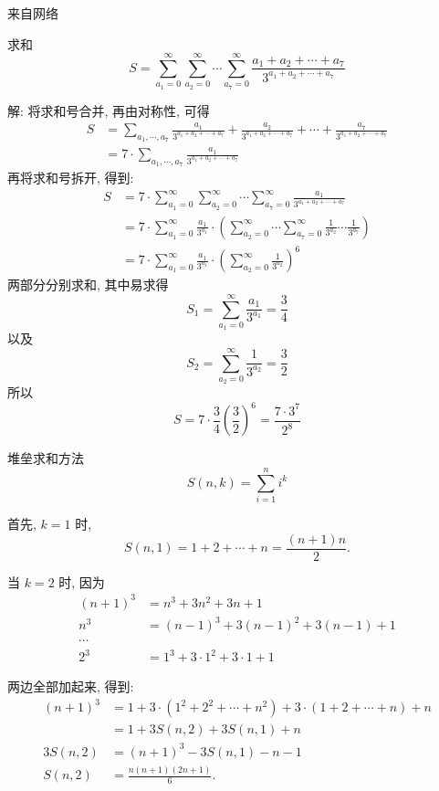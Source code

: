 \noindent 来自网络

求和
\[ 
S = \sum_{a_1=0}^{\infty}\sum_{a_2=0}^{\infty}\cdots\sum_{a_7=0}^{\infty}{\frac{a_1+a_2+\cdots+a_7}{3^{a_1+a_2+\cdots+a_7}}}
\]

解: 将求和号合并, 再由对称性, 可得
\begin{align*}
S &= \sum_{a_1,\cdots,a_7} {\frac{a_1}{3^{a_1+a_2+\cdots+a_7}} + \frac{a_2}{3^{a_1+a_2+\cdots+a_7}} + \cdots + \frac{a_7}{3^{a_1+a_2+\cdots+a_7}}} \\
 &= 7\cdot\sum_{a_1,\cdots,a_7} {\frac{a_1}{3^{a_1+a_2+\cdots+a_7}}}
\end{align*}
再将求和号拆开, 得到:
\begin{align*}
S &= 7\cdot \sum_{a_1=0}^{\infty}\sum_{a_2=0}^{\infty}\cdots\sum_{a_7=0}^{\infty}{\frac{a_1}{3^{a_1+a_2+\cdots+a_7}}} \\
&=  7\cdot \sum_{a_1=0}^{\infty}\frac{a_1}{3^{a_1}}\cdot\left(\sum_{a_2=0}^{\infty}\cdots\sum_{a_7=0}^{\infty}{\frac{1}{3^{a_2}}\cdots\frac{1}{3^{a_7}}}\right)\\
&= 7\cdot \sum_{a_1=0}^{\infty}\frac{a_1}{3^{a_1}}\cdot\left(\sum_{a_2=0}^{\infty}{\frac{1}{3^{a_2}}}\right)^6
\end{align*}
两部分分别求和, 其中易求得
\[
S_1 = \sum_{a_1=0}^{\infty}\frac{a_1}{3^{a_1}} = \frac{3}{4}
\]
以及 
\[ S_2 = \sum_{a_2=0}^{\infty}\frac{1}{3^{a_2}} = \frac{3}{2}
\]
所以 
\[
S = 7\cdot\frac{3}{4}(\frac{3}{2})^6 = \frac{7\cdot 3^7}{2^8}
\]


\newpage

\noindent 堆垒求和方法
\[ S(n,k) = \sum_{i=1}^{n}{i^k} \]

首先, $ k = 1 $ 时, \[ S(n,1) = 1 + 2 + \cdots + n = \frac{(n+1)n}{2} .\]

当 $ k = 2 $ 时, 因为
\begin{align*}
(n+1)^3 &= n^3 + 3n^2 + 3n + 1 \\ 
n^3 &= (n-1)^3 + 3(n-1)^2 + 3(n-1) + 1\\
\cdots & \\
 2^3 &= 1^3 + 3\cdot 1^2 + 3\cdot 1 + 1
\end{align*}

两边全部加起来, 得到: 
\begin{align*} 
(n+1)^3 &= 1 + 3\cdot(1^2+2^2+\cdots+n^2) + 3\cdot(1+2+\cdots+n) + n \\
	&= 1 + 3S(n,2) + 3S(n,1) + n\\
3S(n,2) &= (n+1)^3 - 3S(n,1) - n - 1 \\
	S(n,2) &= \frac{n(n+1)(2n+1)}{6} .
\end{align*}

